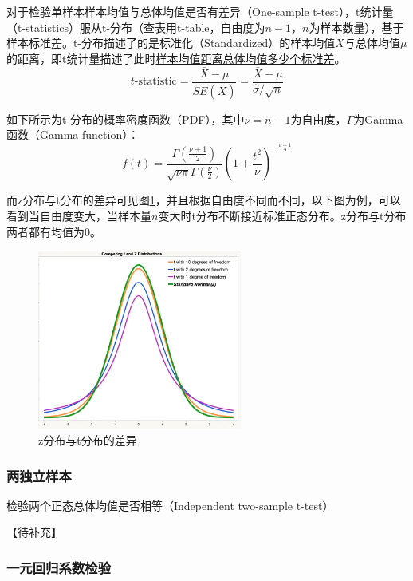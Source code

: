 \documentclass[11pt]{article}
\begin{document}
对于检验单样本样本均值与总体均值是否有差异（One-sample t-test），t统计量（t-statistics）服从t-分布（查表用t-table，自由度为$n-1$，$n$为样本数量），基于样本标准差。t-分布描述了的是标准化（Standardized）的样本均值$\bar{X}$与总体均值$\mu$的距离，即t统计量描述了此时\uline{样本均值距离总体均值多少个标准差}。
\begin{equation*}
    t\text{-statistic} = \frac{\bar{X}-\mu}{SE(\bar{X})} = \frac{\bar{X}-\mu}{\hat{\sigma}/\sqrt{n}}
\end{equation*}

如下所示为t-分布的概率密度函数（PDF），其中$\nu=n-1$为自由度，$\Gamma$为Gamma函数（Gamma function）：
\begin{equation*}
    f(t) = \frac{\Gamma\left( \frac{\nu+1}{2} \right)}{\sqrt{\nu\pi} \Gamma\left( \frac{\nu}{2} \right)} \left( 1+\frac{t^2}{\nu} \right)^{-\frac{\nu+1}{2}}
\end{equation*}

而z分布与t分布的差异可见图\ref{fig:z-and-t-dist}，并且根据自由度不同而不同，以下图为例，可以看到当自由度变大，当样本量$n$变大时t分布不断接近标准正态分布。z分布与t分布两者都有均值为$0$。
\begin{figure}[H]
    \centering
    \includegraphics[width=0.6\textwidth]{fig/z-dist-and-t-dist.png}
    \caption{z分布与t分布的差异}
    \label{fig:z-and-t-dist}
\end{figure}

\subsubsection{两独立样本}

检验两个正态总体均值是否相等（Independent two-sample t-test）

【待补充】

\subsubsection{一元回归系数检验}
\end{document}
